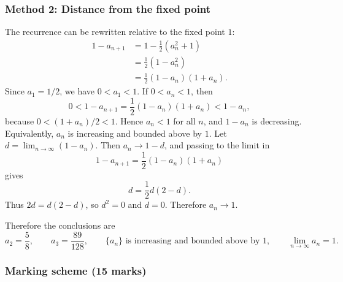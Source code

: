 \documentclass[12pt]{article}
\begin{document}
\newpage
\subsubsection{Method 2: Distance from the fixed point}

The recurrence can be rewritten relative to the fixed point $1$:
\begin{align*}
1-a_{n+1}
&=1-\frac12(a_n^2+1) \\
&=\frac12(1-a_n^2) \\
&=\frac12(1-a_n)(1+a_n).
\end{align*}
Since $a_1=1/2$, we have $0<a_1<1$. If $0<a_n<1$, then
\[
0<1-a_{n+1}=\frac12(1-a_n)(1+a_n)<1-a_n,
\]
because $0<(1+a_n)/2<1$. Hence $a_n<1$ for all $n$, and $1-a_n$ is decreasing. Equivalently, $a_n$ is increasing and bounded above by $1$. Let $d=\lim_{n\to\infty}(1-a_n)$. Then $a_n\to 1-d$, and passing to the limit in
\[
1-a_{n+1}=\frac12(1-a_n)(1+a_n)
\]
gives
\[
d=\frac12 d(2-d).
\]
Thus $2d=d(2-d)$, so $d^2=0$ and $d=0$. Therefore $a_n\to 1$.

Therefore the conclusions are
\[
\boxed{a_2=\frac58,
\qquad a_3=\frac{89}{128},
\qquad \{a_n\}\text{ is increasing and bounded above by }1,
\qquad \lim_{n\to\infty}a_n=1.}
\]

\subsubsection{Marking scheme (15 marks)}
\end{document}
